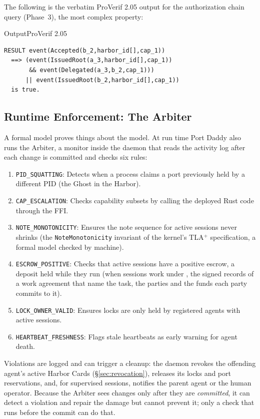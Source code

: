 \documentclass[11pt,a4paper]{article}
\theoremstyle{definition}
\begin{document}
The following is the verbatim ProVerif 2.05 output for the authorization chain query (Phase~3), the most complex property:

\begin{pdlisting}{Output}{ProVerif 2.05}
\begin{lstlisting}[style=pdoutput,caption={ProVerif 2.05 Terminal Output for the Phase 3 Authorization Chain}]
RESULT event(Accepted(b_2,harbor_id[],cap_1))
  ==> (event(IssuedRoot(a_3,harbor_id[],cap_1))
       && event(Delegated(a_3,b_2,cap_1)))
      || event(IssuedRoot(b_2,harbor_id[],cap_1))
  is true.
\end{lstlisting}
\end{pdlisting}

\subsection{Runtime Enforcement: The Arbiter}

A formal model proves things about the model. At run time Port Daddy also runs the Arbiter, a monitor inside the daemon that reads the activity log after each change is committed and checks six rules:

\begin{enumerate}
  \item \texttt{PID\_SQUATTING}: Detects when a process claims a port previously held by a different PID (the Ghost in the Harbor).
  \item \texttt{CAP\_ESCALATION}: Checks capability subsets by calling the deployed Rust code through the FFI.
  \item \texttt{NOTE\_MONOTONICITY}: Ensures the note sequence for active sessions never shrinks (the \texttt{NoteMonotonicity} invariant of the kernel's TLA$^{+}$ specification, a formal model checked by machine).
  \item \texttt{ESCROW\_POSITIVE}: Checks that active sessions have a positive escrow, a deposit held while they run (when sessions work under , the signed records of a work agreement that name the task, the parties and the funds each party commits to it).
  \item \texttt{LOCK\_OWNER\_VALID}: Ensures locks are only held by registered agents with active sessions.
  \item \texttt{HEARTBEAT\_FRESHNESS}: Flags stale heartbeats as early warning for agent death.
\end{enumerate}

Violations are logged and can trigger a cleanup: the daemon revokes the offending agent's active Harbor Cards (\S\ref{sec:revocation}), releases its locks and port reservations, and, for supervised sessions, notifies the parent agent or the human operator. Because the Arbiter sees changes only after they are \emph{committed}, it can detect a violation and repair the damage but cannot prevent it; only a check that runs before the commit can do that.
\end{document}
